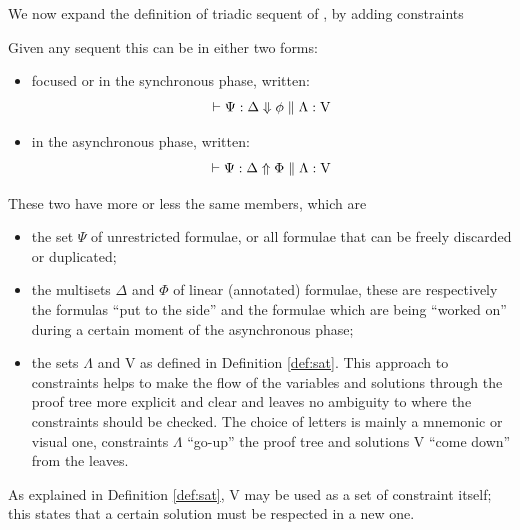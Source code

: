 \documentclass[a4paper, 12pt, tesi, english]{report}
\begin{document}
We now expand the definition of triadic sequent of \cite{Focusing}, by adding constraints
\begin{define}
	Given any sequent this can be in either two forms:
	\begin{itemize}
		\item focused or in the synchronous phase, written:
			$$\vdash \Psi : \Delta \Downarrow \phi \;\Vert\; \Lambda : \text{V}$$
		\item in the asynchronous phase, written:
			$$\vdash \Psi : \Delta \Uparrow \Phi \;\Vert\; \Lambda : \text{V}$$
	\end{itemize}
	These two have more or less the same members, which are
	\begin{itemize}
		\item the set $\Psi$ of unrestricted formulae, or all formulae that can be freely discarded or duplicated;
		\item the multisets $\Delta$ and $\Phi$ of linear (annotated) formulae, these are respectively the formulas ``put to the side'' and the formulae which are being ``worked on'' during a certain moment of the asynchronous phase;
		\item the sets $\Lambda$ and V as defined in Definition \ref{def:sat}.
			This approach to constraints helps to make the flow of the variables and solutions through the proof tree more explicit and clear and leaves no ambiguity to where the constraints should be checked.
			The choice of letters is mainly a mnemonic or visual one, constraints $\Lambda$ ``go-up'' the proof tree and solutions V ``come down'' from the leaves.
	\end{itemize}
\end{define}
As explained in Definition \ref{def:sat}, V may be used as a set of constraint itself; this states that a certain solution must be respected in a new one.
\end{document}
